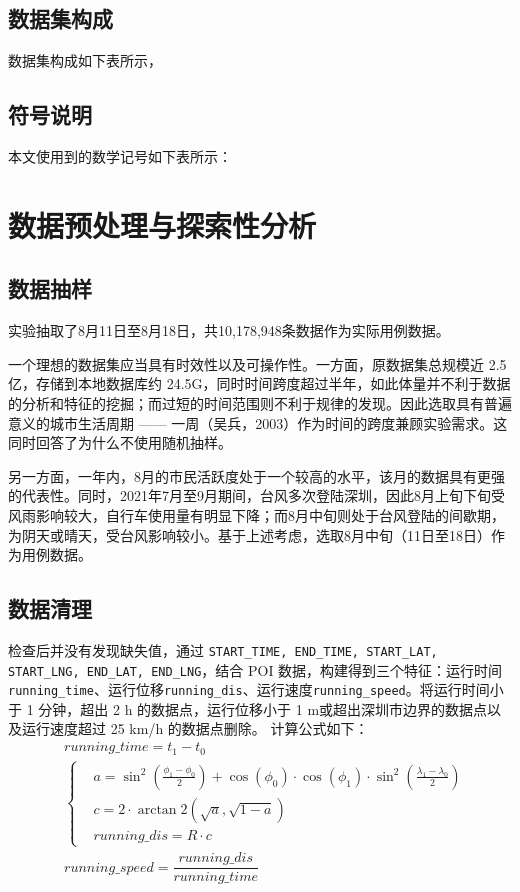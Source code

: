 \documentclass[12pt,a4paper,oneside]{ctexart}
\begin{document}
\subsection{数据集构成}

数据集构成如下表所示，


\subsection{符号说明}

本文使用到的数学记号如下表所示：



\section{数据预处理与探索性分析}

\subsection{数据抽样}

实验抽取了8月11日至8月18日，共10,178,948条数据作为实际用例数据。

一个理想的数据集应当具有时效性以及可操作性。一方面，原数据集总规模近 2.5 亿，存储到本地数据库约 24.5G，同时时间跨度超过半年，如此体量并不利于数据的分析和特征的挖掘；而过短的时间范围则不利于规律的发现。因此选取具有普遍意义的城市生活周期 —— 一周（吴兵，2003\cite{吴兵2003城市生命周期}）作为时间的跨度兼顾实验需求。这同时回答了为什么不使用随机抽样。

另一方面，一年内，8月的市民活跃度处于一个较高的水平，该月的数据具有更强的代表性。同时，2021年7月至9月期间，台风多次登陆深圳，因此8月上旬下旬受风雨影响较大，自行车使用量有明显下降；而8月中旬则处于台风登陆的间歇期\cite{CMA_API_Documentation}，为阴天或晴天，受台风影响较小。基于上述考虑，选取8月中旬（11日至18日）作为用例数据。

\subsection{数据清理}

检查后并没有发现缺失值，通过 \texttt{START\_TIME, END\_TIME, START\_LAT, START\_LNG, END\_LAT, END\_LNG}，结合 POI 数据，构建得到三个特征：运行时间\texttt{running\_time}、运行位移\texttt{running\_dis}、运行速度\texttt{running\_speed}。将运行时间小于 1 分钟，超出 2 h 的数据点，运行位移小于 1 m或超出深圳市边界的数据点以及运行速度超过 25 km/h 的数据点删除。
计算公式如下：
\begin{align}
& running\_time = t_1 - t_0 \\
& \begin{cases}\label{Haversine}
    &a= \sin^2\left(\frac{\phi_1 - \phi_0}{2}\right) + 
    \cos(\phi_0) \cdot \cos(\phi_1) \cdot 
    \sin^2\left(\frac{\lambda_1 - \lambda_0}{2}\right) \\
&c = 2 \cdot \arctan2\left(\sqrt{a}, \sqrt{1-a}\right) \\
&running\_dis = R \cdot c
\end{cases}\\
& running\_speed = \dfrac{running\_dis}{running\_time}
\end{align}
\end{document}
